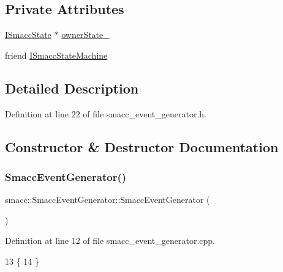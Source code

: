 \subsection*{Private Attributes}
\begin{DoxyCompactItemize}
\item 
\hyperlink{classsmacc_1_1ISmaccState}{I\+Smacc\+State} $\ast$ \hyperlink{classsmacc_1_1SmaccEventGenerator_ac7efdd1d9c69906c3a9d3f66e13bb04a}{owner\+State\+\_\+}
\item 
friend \hyperlink{classsmacc_1_1SmaccEventGenerator_acf9f0c148c1ca8b39fd21aaf52d4ea39}{I\+Smacc\+State\+Machine}
\end{DoxyCompactItemize}


\subsection{Detailed Description}


Definition at line 22 of file smacc\+\_\+event\+\_\+generator.\+h.



\subsection{Constructor \& Destructor Documentation}
\mbox{\label{classsmacc_1_1SmaccEventGenerator_a26d17f3c1126a03107d452c95eef5136}} 
\subsubsection{\texorpdfstring{Smacc\+Event\+Generator()}{SmaccEventGenerator()}}
{\footnotesize\ttfamily smacc\+::\+Smacc\+Event\+Generator\+::\+Smacc\+Event\+Generator (\begin{DoxyParamCaption}{ }\end{DoxyParamCaption})}



Definition at line 12 of file smacc\+\_\+event\+\_\+generator.\+cpp.


\begin{DoxyCode}
13     \{
14     \}
\end{DoxyCode}
\mbox{\label{classsmacc_1_1SmaccEventGenerator_a3032b762f40b72e76d6c5713ee44e138}} 
